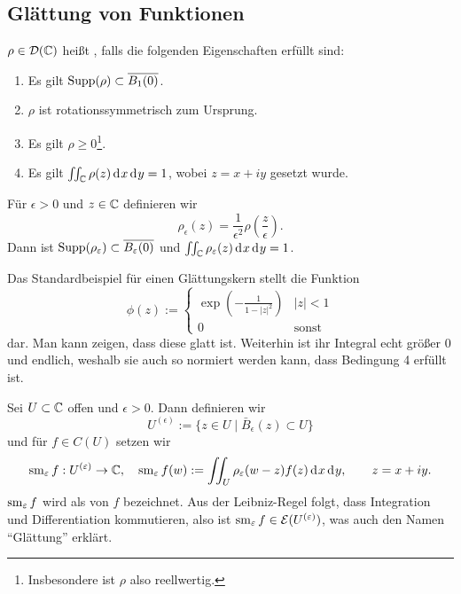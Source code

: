 \subsection{Glättung von Funktionen}
\label{sec:Glättung}

\begin{defin}[Glättungskern]
  $\rho \in \mathcal{D}(\mathbb{C})$ heißt , falls die folgenden
  Eigenschaften erfüllt sind:
  \begin{enumerate}
  \item Es gilt $\operatorname{Supp}(\rho) \subset \overline{B_1(0)}$.
  \item $\rho$ ist rotationssymmetrisch zum Ursprung.
  \item Es gilt $\rho \geq 0$\footnote{Insbesondere ist $\rho$ also reellwertig.}.
  \item Es gilt $\iint_\C \rho(z) \d[x]\d[y] = 1$, wobei $z = x + iy$
    gesetzt wurde.
  \end{enumerate}
  Für $\epsilon > 0$ und $z \in \mathbb{C}$ definieren wir
  \[
  \rho_\epsilon(z) = \frac{1}{\epsilon^2} \rho\left(
    \frac{z}{\epsilon} \right ).
  \]
  Dann ist $\operatorname{Supp}(\rho_\varepsilon) \subset \overline{B_\varepsilon(0)}$ und
  $\iint_\C \rho_\epsilon(z) \d[x]\d[y] = 1$.
\end{defin}


\begin{bsp}
  Das Standardbeispiel für einen Glättungskern stellt die Funktion
  \[
  \phi(z) :=
  \begin{cases}
    \exp \left ( - \frac{1}{1 - |z|^2} \right ) & |z| < 1 \\
    0 & \text{sonst}
  \end{cases}
  \]
  dar. 
  Man kann zeigen, dass diese glatt ist. Weiterhin ist ihr Integral
  echt größer 0 und endlich, weshalb sie auch so normiert werden kann, dass
  Bedingung 4 erfüllt ist.
\end{bsp}

\begin{defin}
  Sei $U \subset \mathbb{C}$ offen und $\epsilon > 0$. Dann definieren wir
  \[
  U^{(\epsilon)} := \{z \in U \mid \bar B_\epsilon(z) \subset U \}
  \]
  und für $f \in C(U)$ setzen wir
  \[
  \sm_\epsilon f : U^{(\epsilon)} \ra \C, \quad \sm_\epsilon f(w) :=
  \iint_U \rho_\epsilon(w- z) f(z) \d[x]\d[y], \qquad z = x + iy.
  \]
  $\operatorname{sm}_\varepsilon f$ wird als  von $f$ bezeichnet. 
  Aus der Leibniz-Regel folgt, dass Integration und Differentiation
  kommutieren, also ist $\operatorname{sm}_\varepsilon f \in \mathcal{E}(U^{(\varepsilon)})$, was
  auch den Namen "`Glättung"' erklärt.
\end{defin}

